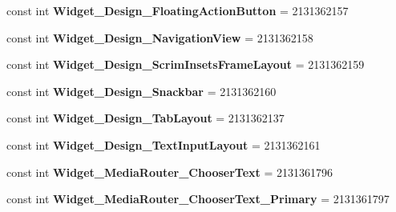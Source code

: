 \begin{DoxyCompactItemize}
const int {\bfseries Widget\+\_\+\+Design\+\_\+\+Floating\+Action\+Button} = 2131362157
\item 
\mbox{\label{class_sample_app_1_1_droid_1_1_resource_1_1_style_a2f54000883010fc98cdc47462c7605c9}} 
const int {\bfseries Widget\+\_\+\+Design\+\_\+\+Navigation\+View} = 2131362158
\item 
\mbox{\label{class_sample_app_1_1_droid_1_1_resource_1_1_style_adadef342871d41d1721e5597a96677bb}} 
const int {\bfseries Widget\+\_\+\+Design\+\_\+\+Scrim\+Insets\+Frame\+Layout} = 2131362159
\item 
\mbox{\label{class_sample_app_1_1_droid_1_1_resource_1_1_style_a7ec670b9efb9c4816bbe75f3b68f8af8}} 
const int {\bfseries Widget\+\_\+\+Design\+\_\+\+Snackbar} = 2131362160
\item 
\mbox{\label{class_sample_app_1_1_droid_1_1_resource_1_1_style_a856a5844d2870262ef1515533f69bda2}} 
const int {\bfseries Widget\+\_\+\+Design\+\_\+\+Tab\+Layout} = 2131362137
\item 
\mbox{\label{class_sample_app_1_1_droid_1_1_resource_1_1_style_ac3970f0f741043bbb8a24a57c79a17bc}} 
const int {\bfseries Widget\+\_\+\+Design\+\_\+\+Text\+Input\+Layout} = 2131362161
\item 
\mbox{\label{class_sample_app_1_1_droid_1_1_resource_1_1_style_a9106e776eed98b7caec369d2a3afaa0a}} 
const int {\bfseries Widget\+\_\+\+Media\+Router\+\_\+\+Chooser\+Text} = 2131361796
\item 
\mbox{\label{class_sample_app_1_1_droid_1_1_resource_1_1_style_a3f8c7175ef01e49d1137f2e602e7fed2}} 
const int {\bfseries Widget\+\_\+\+Media\+Router\+\_\+\+Chooser\+Text\+\_\+\+Primary} = 2131361797
\item 
\mbox{\label{class_sample_app_1_1_droid_1_1_resource_1_1_style_ae8368cfcdece2e481cd3609be180449f}} 

\end{DoxyCompactItemize}
